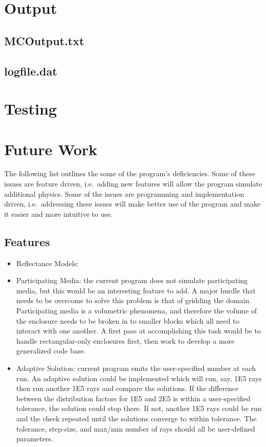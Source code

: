 \documentclass{article}
\begin{document}
\section{Output}
\label{sec:output}

\subsection{MCOutput.txt}

\subsection{logfile.dat}

\section{Testing}
\label{sec:testing}


\section{Future Work}
\label{sec:future work}

The following list outlines the some of the program's deficiencies. Some of these issues are feature driven, i.e.~adding new features will allow the program simulate additional physics. Some of the issues are programming and implementation driven, i.e.~addressing these issues will make better use of the program and make it easier and more intuitive to use.

\subsection{Features}

\begin{itemize}
	\item Reflectance Models:

	\item Participating Media: the current program does not simulate participating media, but this would be an interesting feature to add. A major hurdle that needs to be overcome to solve this problem is that of gridding the domain. Participating media is a volumetric phenomena, and therefore the volume of the enclosure needs to be broken in to smaller blocks which all need to interact with one another. A first pass at accomplishing this task would be to handle rectangular-only enclosures first, then work to develop a more generalized code base.

	\item Adaptive Solution: current program emits the user-specified number at each run. An adaptive solution could be implemented which will run, say, \SI{1E5}{} rays then run another \SI{1E5}{} rays and compare the solutions. If the difference between the distribution factors for \SI{1E5}{} and \SI{2E5}{} is within a user-specified tolerance, the solution could stop there. If not, another \SI{1E5}{} rays could be run and the check repeated until the solutions converge to within tolerance. The tolerance, step-size, and max/min number of rays should all be user-defined parameters.
\end{itemize}
\end{document}
